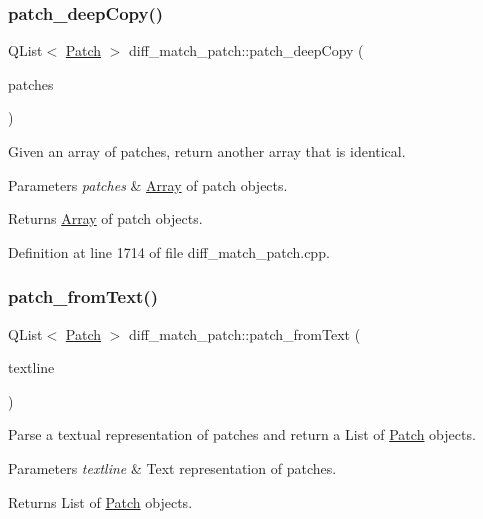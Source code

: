 \subsubsection{\texorpdfstring{patch\+\_\+deep\+Copy()}{patch\_deepCopy()}}
{\footnotesize\ttfamily Q\+List$<$ \hyperlink{class_patch}{Patch} $>$ diff\+\_\+match\+\_\+patch\+::patch\+\_\+deep\+Copy (\begin{DoxyParamCaption}\item[{Q\+List$<$ \hyperlink{class_patch}{Patch} $>$ \&}]{patches }\end{DoxyParamCaption})}

Given an array of patches, return another array that is identical. 
\begin{DoxyParams}{Parameters}
{\em patches} & \hyperlink{class_array}{Array} of patch objects. \\
\hline
\end{DoxyParams}
\begin{DoxyReturn}{Returns}
\hyperlink{class_array}{Array} of patch objects. 
\end{DoxyReturn}


Definition at line 1714 of file diff\+\_\+match\+\_\+patch.\+cpp.

\mbox{\label{classdiff__match__patch_a2d3d6460ce369b1f506a2c5d6b3fdee9}} 
\subsubsection{\texorpdfstring{patch\+\_\+from\+Text()}{patch\_fromText()}}
{\footnotesize\ttfamily Q\+List$<$ \hyperlink{class_patch}{Patch} $>$ diff\+\_\+match\+\_\+patch\+::patch\+\_\+from\+Text (\begin{DoxyParamCaption}\item[{const Q\+String \&}]{textline }\end{DoxyParamCaption})}

Parse a textual representation of patches and return a List of \hyperlink{class_patch}{Patch} objects. 
\begin{DoxyParams}{Parameters}
{\em textline} & Text representation of patches. \\
\hline
\end{DoxyParams}
\begin{DoxyReturn}{Returns}
List of \hyperlink{class_patch}{Patch} objects. 
\end{DoxyReturn}

